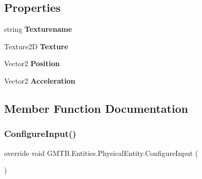 \subsection*{Properties}
\begin{DoxyCompactItemize}
\item 
\mbox{\label{class_g_m_t_b_1_1_entities_1_1_physical_entity_aeac9da2c5c6a8e12a83456c94ffa5ab9}} 
string {\bfseries Texturename}
\item 
\mbox{\label{class_g_m_t_b_1_1_entities_1_1_physical_entity_ad0a964893bdef5928726eb7af82f6863}} 
Texture2D {\bfseries Texture}
\item 
\mbox{\label{class_g_m_t_b_1_1_entities_1_1_physical_entity_a81bd691d08fab5e84b64e01f289af752}} 
Vector2 {\bfseries Position}
\item 
\mbox{\label{class_g_m_t_b_1_1_entities_1_1_physical_entity_ae76dea649a0c77fe1a4769c41388c271}} 
Vector2 {\bfseries Acceleration}
\end{DoxyCompactItemize}


\subsection{Member Function Documentation}
\mbox{\label{class_g_m_t_b_1_1_entities_1_1_physical_entity_ac8ffd1ce4e40a17980f70b97e941451c}} 
\subsubsection{\texorpdfstring{ConfigureInput()}{ConfigureInput()}}
{\footnotesize\ttfamily override void G\+M\+T\+B.\+Entities.\+Physical\+Entity.\+Configure\+Input (\begin{DoxyParamCaption}{ }\end{DoxyParamCaption})\hspace{0.3cm}{\ttfamily [virtual]}}



